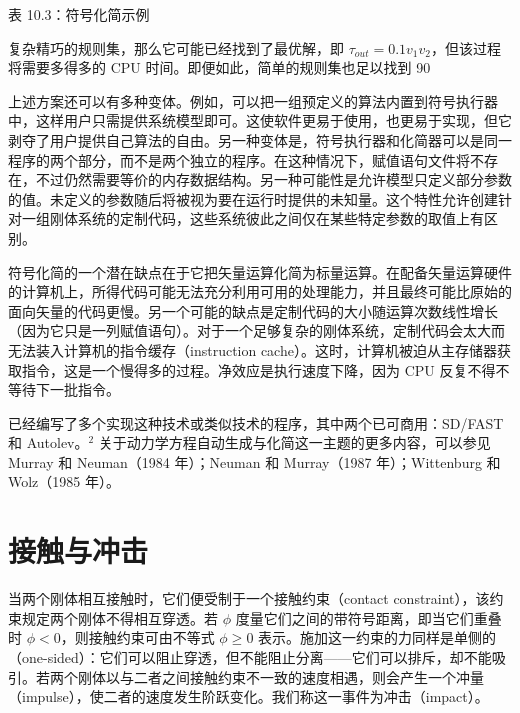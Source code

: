 \documentclass[10pt,a4paper]{book}
\theoremstyle{thmstyle} %
\theoremstyle{defstyle} %
\theoremstyle{prostyle} %
\begin{document}
表 10.3：符号化简示例





复杂精巧的规则集，那么它可能已经找到了最优解，即 $\tau_{out} = 0.1v_1v_2$，但该过程将需要多得多的 CPU 时间。即便如此，简单的规则集也足以找到 90%



上述方案还可以有多种变体。例如，可以把一组预定义的算法内置到符号执行器中，这样用户只需提供系统模型即可。这使软件更易于使用，也更易于实现，但它剥夺了用户提供自己算法的自由。另一种变体是，符号执行器和化简器可以是同一程序的两个部分，而不是两个独立的程序。在这种情况下，赋值语句文件将不存在，不过仍然需要等价的内存数据结构。另一种可能性是允许模型只定义部分参数的值。未定义的参数随后将被视为要在运行时提供的未知量。这个特性允许创建针对一组刚体系统的定制代码，这些系统彼此之间仅在某些特定参数的取值上有区别。



符号化简的一个潜在缺点在于它把矢量运算化简为标量运算。在配备矢量运算硬件的计算机上，所得代码可能无法充分利用可用的处理能力，并且最终可能比原始的面向矢量的代码更慢。另一个可能的缺点是定制代码的大小随运算次数线性增长（因为它只是一列赋值语句）。对于一个足够复杂的刚体系统，定制代码会太大而无法装入计算机的指令缓存（instruction cache）。这时，计算机被迫从主存储器获取指令，这是一个慢得多的过程。净效应是执行速度下降，因为 CPU 反复不得不等待下一批指令。



已经编写了多个实现这种技术或类似技术的程序，其中两个已可商用：SD/FAST 和 Autolev。$^{2}$ 关于动力学方程自动生成与化简这一主题的更多内容，可以参见 Murray 和 Neuman（1984 年）；Neuman 和 Murray（1987 年）；Wittenburg 和 Wolz（1985 年）。





\chapter{接触与冲击}







当两个刚体相互接触时，它们便受制于一个接触约束（contact constraint），该约束规定两个刚体不得相互穿透。若 $\phi$ 度量它们之间的带符号距离，即当它们重叠时 $\phi < 0$，则接触约束可由不等式 $\phi \geq 0$ 表示。施加这一约束的力同样是单侧的（one-sided）：它们可以阻止穿透，但不能阻止分离——它们可以排斥，却不能吸引。若两个刚体以与二者之间接触约束不一致的速度相遇，则会产生一个冲量（impulse），使二者的速度发生阶跃变化。我们称这一事件为冲击（impact）。
\end{document}
